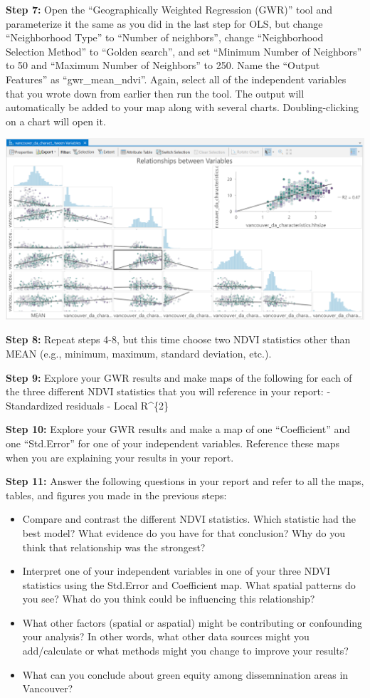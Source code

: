 \documentclass[
]{book}
\providecommand{\tightlist}{%
  \setlength{\itemsep}{0pt}\setlength{\parskip}{0pt}}
\begin{document}
\textbf{Step 7:} Open the ``Geographically Weighted Regression (GWR)'' tool and parameterize it the same as you did in the last step for OLS, but change ``Neighborhood Type'' to ``Number of neighbors'', change ``Neighborhood Selection Method'' to ``Golden search'', and set ``Minimum Number of Neighbors'' to 50 and ``Maximum Number of Neighbors'' to 250. Name the ``Output Features'' as ``gwr\_mean\_ndvi''. Again, select all of the independent variables that you wrote down from earlier then run the tool. The output will automatically be added to your map along with several charts. Doubling-clicking on a chart will open it.

\includegraphics[width=1\linewidth]{images/06-arcgis-variable-chart}

\textbf{Step 8:} Repeat steps 4-8, but this time choose two NDVI statistics other than MEAN (e.g., minimum, maximum, standard deviation, etc.).

\textbf{Step 9:} Explore your GWR results and make maps of the following for each of the three different NDVI statistics that you will reference in your report:
- Standardized residuals
- Local R\^{}\{2\}

\textbf{Step 10:} Explore your GWR results and make a map of one ``Coefficient'' and one ``Std.Error'' for one of your independent variables. Reference these maps when you are explaining your results in your report.

\textbf{Step 11:} Answer the following questions in your report and refer to all the maps, tables, and figures you made in the previous steps:

\begin{itemize}
\tightlist
\item
  Compare and contrast the different NDVI statistics. Which statistic had the best model? What evidence do you have for that conclusion? Why do you think that relationship was the strongest?
\item
  Interpret one of your independent variables in one of your three NDVI statistics using the Std.Error and Coefficient map. What spatial patterns do you see? What do you think could be influencing this relationship?
\item
  What other factors (spatial or aspatial) might be contributing or confounding your analysis? In other words, what other data sources might you add/calculate or what methods might you change to improve your results?
\item
  What can you conclude about green equity among dissemnination areas in Vancouver?
\end{itemize}
\end{document}
